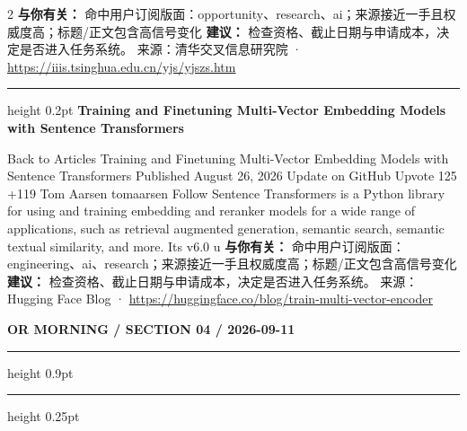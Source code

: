 \documentclass[10.5pt]{ctexart}
\begin{document}
\begin{multicols}{2}
\textbf{与你有关：} 命中用户订阅版面：opportunity、research、ai；来源接近一手且权威度高；标题/正文包含高信号变化
\textbf{建议：} 检查资格、截止日期与申请成本，决定是否进入任务系统。
{\footnotesize\color{ormuted} 来源：清华交叉信息研究院 · \url{https://iiis.tsinghua.edu.cn/yjs/yjszs.htm}}
\vspace{2mm}
\hrule height 0.2pt
\vspace{2mm}
{\large\bfseries Training and Finetuning Multi-Vector Embedding Models with Sentence Transformers}\par
Back to Articles Training and Finetuning Multi-Vector Embedding Models with Sentence Transformers Published August 26, 2026 Update on GitHub Upvote 125 +119 Tom Aarsen tomaarsen Follow Sentence Transformers is a Python library for using and training embedding and reranker models for a wide range of applications, such as retrieval augmented generation, semantic search, semantic textual similarity, and more. Its v6.0 u
\textbf{与你有关：} 命中用户订阅版面：engineering、ai、research；来源接近一手且权威度高；标题/正文包含高信号变化
\textbf{建议：} 检查资格、截止日期与申请成本，决定是否进入任务系统。
{\footnotesize\color{ormuted} 来源：Hugging Face Blog · \url{https://huggingface.co/blog/train-multi-vector-encoder}}
\end{multicols}
\newpage
{\small\bfseries OR MORNING / SECTION 04 / 2026-09-11}
\vspace{2mm}
\hrule height 0.9pt
\vspace{1.5mm}
\hrule height 0.25pt
\vspace{4mm}
\end{document}
